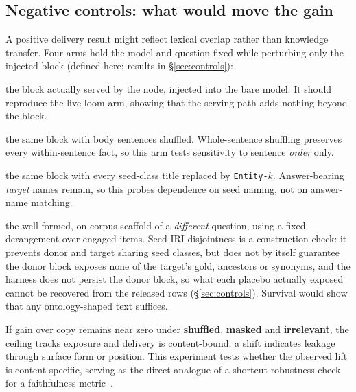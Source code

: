 \documentclass[10pt,twocolumn]{article}
\begin{document}
\subsection{Negative controls: what would move the gain}\label{sec:ceiling-controls}
A positive delivery result might reflect lexical overlap rather than knowledge transfer. Four arms hold the model and question fixed while perturbing only the injected block (defined here; results in \S\ref{sec:controls}):
\begin{description}[topsep=2pt,itemsep=1pt,leftmargin=0pt,font=\normalfont\itshape]
\item[true] the block actually served by the node, injected into the bare model. It should reproduce the live loom arm, showing that the serving path adds nothing beyond the block.
\item[shuffled] the same block with body sentences shuffled. Whole-sentence shuffling preserves every within-sentence fact, so this arm tests sensitivity to sentence \emph{order} only.
\item[masked] the same block with every seed-class title replaced by \texttt{Entity-$k$}. Answer-bearing \emph{target} names remain, so this probes dependence on seed naming, not on answer-name matching.
\item[irrelevant] the well-formed, on-corpus scaffold of a \emph{different} question, using a fixed derangement over engaged items. Seed-IRI disjointness is a construction check: it prevents donor and target sharing seed classes, but does not by itself guarantee the donor block exposes none of the target's gold, ancestors or synonyms, and the harness does not persist the donor block, so what each placebo actually exposed cannot be recovered from the released rows (\S\ref{sec:controls}). Survival would show that any ontology-shaped text suffices.
\end{description}
If gain over copy remains near zero under \textbf{shuffled}, \textbf{masked} and \textbf{irrelevant}, the ceiling tracks exposure and delivery is content-bound; a shift indicates leakage through surface form or position. This experiment tests whether the observed lift is content-specific, serving as the direct analogue of a shortcut-robustness check for a faithfulness metric~\cite{gao2023alce}.
\end{document}
